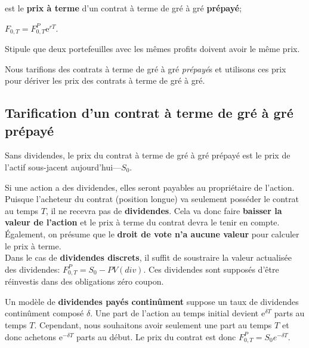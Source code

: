 \documentclass[10pt, french]{article}
\begin{document}
\begin{multicols*}{2}
\begin{distributions}
\begin{description}
	\item[$F_{0, T}^{P}$:]	est le \textbf{prix à terme} d'un contrat à terme de gré à gré \textbf{prépayé};
	\item	$F_{0, T} = F_{0, T}^{P} \textrm{e}^{rT}$.
\end{description}
\end{distributions}

\begin{definitionNOHFILL}
Stipule que deux portefeuilles avec les mêmes profits doivent avoir le même prix.

Nous tarifions des contrats à terme de gré à gré \textit{prépayé}s et utilisons ces prix pour dériver les prix des contrats à terme de gré à gré. 
\end{definitionNOHFILL}

\columnbreak

\subsection{Tarification d'un \textbf{contrat à terme de gré à gré prépayé}}

Sans dividendes, le prix du contrat à terme de gré à gré prépayé est le prix de l'actif sous-jacent aujourd'hui---$S_{0}$. 

Si une action a des dividendes, elles seront payables au propriétaire de l'action. Puisque l'acheteur du contrat (position longue) va seulement posséder le contrat au temps $T$, il ne recevra pas de \textbf{dividendes}. Cela va donc faire \textbf{baisser la valeur de l'action} et le prix à terme du contrat devra le tenir en compte. Également, on présume que le \textbf{droit de vote n'a aucune valeur} pour calculer le prix à terme.\\

Dans le cas de \textbf{dividendes discrets}, il suffit de soustraire la valeur actualisée des dividendes: $F_{0, T}^{P} = S_{0} - PV(div)$. Ces dividendes sont supposés d'être réinvestis dans des obligations zéro coupon.

Un modèle de \textbf{dividendes payés continûment} suppose un taux de dividendes continûment composé $\delta$. Une part de l'action au temps initial devient $\textrm{e}^{\delta T}$ parts au temps $T$. Cependant, nous souhaitons avoir seulement une part au temps $T$ et donc achetons $\textrm{e}^{-\delta T}$ parts au début. Le prix du contrat est donc $F_{0, T}^{P} = S_{0} e^{-\delta T}$.


\end{multicols*}
\end{document}
